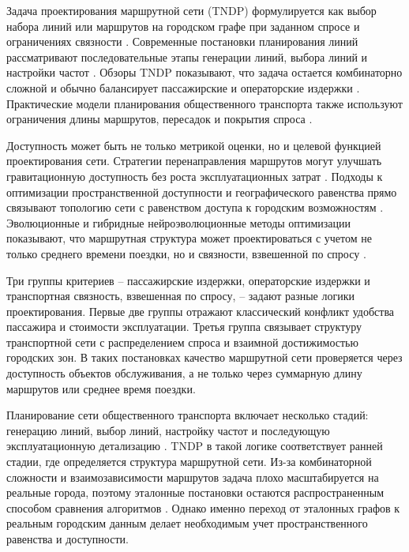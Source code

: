 Задача проектирования маршрутной сети (TNDP) формулируется как выбор набора линий или маршрутов на городском графе при заданном спросе и ограничениях связности \cite{mandl1980tndp}. Современные постановки планирования линий рассматривают последовательные этапы генерации линий, выбора линий и настройки частот \cite{schmidt2024linePlanning}. Обзоры TNDP показывают, что задача остается комбинаторно сложной и обычно балансирует пассажирские и операторские издержки \cite{duranMicco2022tndpReview}. Практические модели планирования общественного транспорта также используют ограничения длины маршрутов, пересадок и покрытия спроса \cite{sahin2023linePlanning}.

Доступность может быть не только метрикой оценки, но и целевой функцией проектирования сети. Стратегии перенаправления маршрутов могут улучшать гравитационную доступность без роста эксплуатационных затрат \cite{rumpf2021reroutingAccessibility}. Подходы к оптимизации пространственной доступности и географического равенства прямо связывают топологию сети с равенством доступа к городским возможностям \cite{wang2024spatialEquityTndp}. Эволюционные и гибридные нейроэволюционные методы оптимизации показывают, что маршрутная структура может проектироваться с учетом не только среднего времени поездки, но и связности, взвешенной по спросу \cite{holliday2024tndpLearning}.

Три группы критериев -- пассажирские издержки, операторские издержки и транспортная связность, взвешенная по спросу, -- задают разные логики проектирования. Первые две группы отражают классический конфликт удобства пассажира и стоимости эксплуатации. Третья группа связывает структуру транспортной сети с распределением спроса и взаимной достижимостью городских зон. В таких постановках качество маршрутной сети проверяется через доступность объектов обслуживания, а не только через суммарную длину маршрутов или среднее время поездки.

Планирование сети общественного транспорта включает несколько стадий: генерацию линий, выбор линий, настройку частот и последующую эксплуатационную детализацию \cite{borndorfer2017linePlanning}. TNDP в такой логике соответствует ранней стадии, где определяется структура маршрутной сети. Из-за комбинаторной сложности и взаимозависимости маршрутов задача плохо масштабируется на реальные города, поэтому эталонные постановки остаются распространенным способом сравнения алгоритмов \cite{mumford2013tndpHeuristic}. Однако именно переход от эталонных графов к реальным городским данным делает необходимым учет пространственного равенства и доступности.

